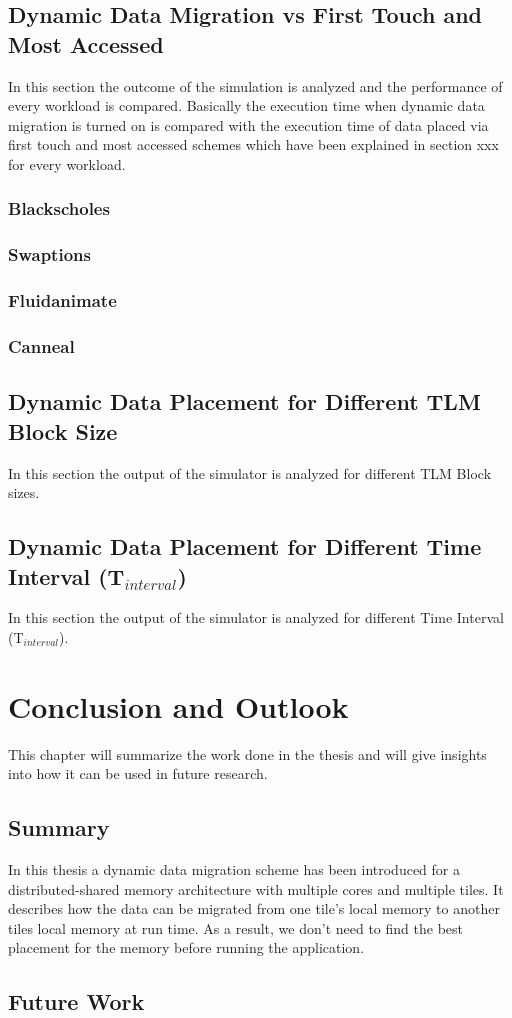 \documentclass{listhesis}
\begin{document}
\section{Dynamic Data Migration vs First Touch and Most Accessed}
In this section the outcome of the simulation is analyzed and the performance of every workload is compared. Basically the execution time when dynamic data migration is turned on is compared with the execution time of data placed via first touch and most accessed schemes which have been explained in section xxx for every workload.
\subsection{Blackscholes}

\subsection{Swaptions}

\subsection{Fluidanimate}

\subsection{Canneal}


\section{Dynamic Data Placement for Different TLM Block Size}
In this section the output of the simulator is analyzed for different TLM Block sizes. 

\section{Dynamic Data Placement for Different Time Interval (T$_{interval}$)}
In this section the output of the simulator is analyzed for different Time Interval (T$_{interval}$).
\chapter{Conclusion and Outlook}
This chapter will summarize the work done in the thesis and will give insights into how it can be used in future research. 
\section{Summary}
In this thesis a dynamic data migration scheme has been introduced for a distributed-shared memory architecture with multiple cores and multiple tiles. It describes how the data can be migrated from one tile's  local memory to another tiles local memory at run time. As a result, we don't need to find the best placement for the memory before running the application.
\section{Future Work}

\cleardoublepage



\confirmation
\end{document}

